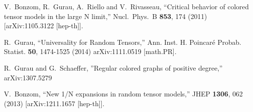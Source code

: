 \documentclass[aps,prd,10pt,notitlepage,nofootinbib,superscriptaddress,showkeys,showpacs]{revtex4-1}
\begin{document}
\begin{thebibliography}{99}
  V.~Bonzom, R.~Gurau, A.~Riello and V.~Rivasseau,
  ``Critical behavior of colored tensor models in the large N limit,''
  Nucl.\ Phys.\ B {\bf 853}, 174 (2011)
  [arXiv:1105.3122 [hep-th]].
  

  R.~Gurau,
  ``Universality for Random Tensors,''
  Ann. Inst. H. Poincar\'e Probab. Statist. {\bf 50}, 1474-1525 (2014)
  arXiv:1111.0519 [math.PR].
  
  R.~Gurau and G.~Schaeffer, 
  ''Regular colored graphs of positive degree,''
  arXiv:1307.5279

  V.~Bonzom,
  ``New 1/N expansions in random tensor models,''
  JHEP {\bf 1306}, 062 (2013)
  [arXiv:1211.1657 [hep-th]].
  
\end{thebibliography}
\end{document}
